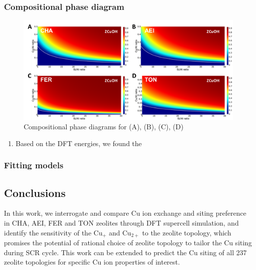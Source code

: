 \documentclass[12pt]{article}
\begin{document}
\subsubsection*{Compositional phase diagram}
\begin{figure}[H]
\centering
  \includegraphics[width=5.2in]{./Figures/Figure-5}
  \caption{Compositional phase diagrams for (A), (B), (C), (D)}
  \label{PhaseDiagram}
\end{figure}

\begin{enumerate}
\item Based on the DFT energies, we found the 
\end{enumerate}
\subsubsection*{Fitting models}

\subsection*{Conclusions}

In this work, we interrogate and compare Cu ion exchange and siting preference in CHA, AEI, FER and TON zeolites through DFT supercell simulation, and identify the sensitivity of the  Cu$_{+}$ and Cu$_{2+}$ to the zeolite topology, which promises the potential of rational choice of zeolite topology to tailor the Cu siting  during SCR cycle. This work can be extended to predict the Cu siting of all 237 zeolite topologies for specific Cu ion properties of interest. 



\end{document}
